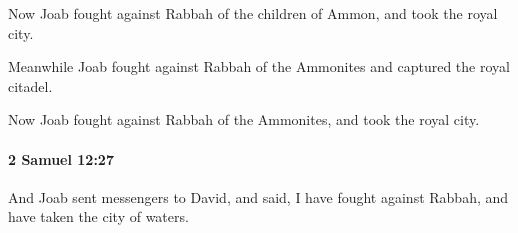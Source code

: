 			\begin{versebox}
					\item[BHS] 
					\item[ASV] Now Joab fought against Rabbah of the children of Ammon, and took the royal city.
					\item[NIV] Meanwhile Joab fought against Rabbah of the Ammonites and captured the royal citadel.
					\item[NRSV] Now Joab fought against Rabbah of the Ammonites, and took the royal city.
			\end{versebox}

		\paragraph{2 Samuel 12:27} %
			\label{2SAMUEL-12-27}

			And Joab sent messengers to David, and said, I have fought against Rabbah, and have taken the city of waters.

